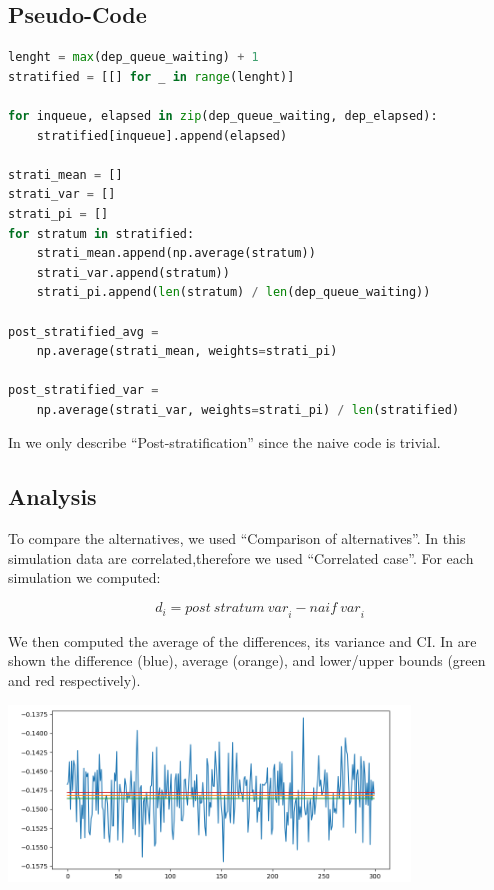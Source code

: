 \documentclass[10pt,a4paper]{article}
\begin{document}
\subsection*{Pseudo-Code}

\begin{lstlisting}[language=python,caption={Post-stratification pseudo-code},captionpos=b,label={lst:post-stratififcation}]
lenght = max(dep_queue_waiting) + 1
stratified = [[] for _ in range(lenght)]

for inqueue, elapsed in zip(dep_queue_waiting, dep_elapsed):
    stratified[inqueue].append(elapsed)

strati_mean = []
strati_var = []
strati_pi = []
for stratum in stratified:
    strati_mean.append(np.average(stratum))
    strati_var.append(stratum))
    strati_pi.append(len(stratum) / len(dep_queue_waiting))

post_stratified_avg = 
    np.average(strati_mean, weights=strati_pi)

post_stratified_var =
    np.average(strati_var, weights=strati_pi) / len(stratified)
\end{lstlisting}

In  we only describe ``Post-stratification'' since the naive code is trivial.

\subsection*{Analysis}

To compare the alternatives, we used ``Comparison of alternatives''. In this simulation  data are correlated,therefore we used ``Correlated case''. For each simulation we computed:

\begin{equation*}
  \mathit{d}_i = \mathit{post\ stratum\ var}_i - \mathit{naif\ var}_i
\end{equation*}

We then computed the average of the differences, its variance and CI. In  are shown the difference (blue), average (orange), and lower/upper bounds (green and red respectively).

\begin{center}
  \includegraphics[width=0.8\textwidth]{post-stratification.png}
  \label{fig:post-stratification}
\end{center}
\end{document}
